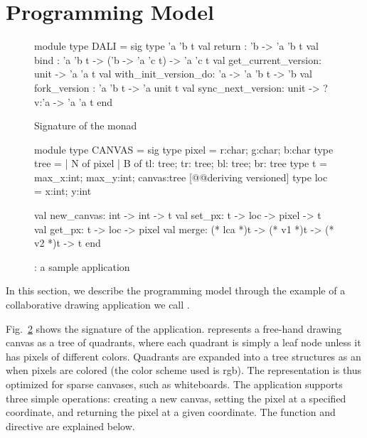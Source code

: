 \section{Programming Model}

\begin{figure}

  \begin{ocaml}
  module type DALI = sig
    type 'a 'b t
    val return : 'b -> 'a 'b t
    val bind : 'a 'b t -> ('b -> 'a 'c t) -> 'a 'c t
    val get_current_version: unit -> 'a 'a t
    val with_init_version_do: 'a -> 'a 'b t -> 'b
    val fork_version : 'a 'b t -> 'a unit t
    val sync_next_version: unit -> ?v:'a -> 'a 'a t
  end
  \end{ocaml}

\label{fig:dali-monad}
\caption{Signature of the \name monad}
\end{figure}

\begin{figure}

  \begin{ocaml}
  module type CANVAS = sig
    type pixel = {r:char; g:char; b:char}
    type tree = 
      | N of pixel
      | B of {tl: tree; tr: tree; bl: tree; br: tree} 
    type t = {max_x:int; max_y:int; canvas:tree} [@@deriving versioned]
    type loc = {x:int; y:int}
  
    val new_canvas: int -> int -> t
    val set_px: t -> loc -> pixel -> t
    val get_px: t -> loc -> pixel
    val merge: (* lca *)t -> (* v1 *)t -> (* v2 *)t -> t
  end
  \end{ocaml}

\caption{\drawsome: a sample \name application}
\label{fig:canvas-sig}
\end{figure}

In this section, we describe the \name programming model through the
example of a collaborative drawing application we call \drawsome.

Fig.~\ref{fig:canvas-sig} shows the signature of the \drawsome
application. \drawsome represents a free-hand drawing canvas as a tree
of quadrants, where each quadrant is simply a leaf node unless it has
pixels of different colors. Quadrants are expanded into a tree
structures as an when pixels are colored (the color scheme used is
rgb). The representation is thus optimized for sparse canvases, such
as whiteboards. The application supports three simple operations:
creating a new canvas, setting the pixel at a specified coordinate,
and returning the pixel at a given coordinate. The  function
and  directive are explained below.


